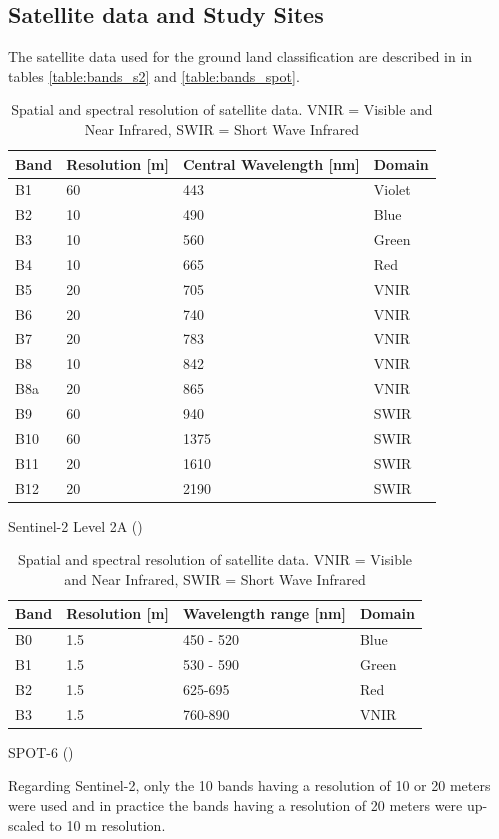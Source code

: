 \documentclass[10pt]{article}
\begin{document}
\subsection{Satellite data and Study Sites}
The satellite data used for the ground land classification are described in in tables \ref{table:bands_s2} and \ref{table:bands_spot}.
\begin{table}[H]
    \centering
    \begin{subtable}{.52\textwidth}
        \centering
        \begin{tabular}{@{}lp{2cm}p{2.2cm}l@{}}\toprule
            Band & Resolution [m] & Central Wavelength [nm] & Domain \\\hline
            B1 & 60 & 443 & Violet \\
            B2 & 10 & 490 & Blue \\
            B3 & 10 & 560 & Green \\
            B4 & 10 & 665 & Red \\
            B5 & 20 & 705 & VNIR \\
            B6 & 20 & 740 & VNIR \\
            B7 & 20 & 783 & VNIR \\
            B8 & 10 & 842 & VNIR \\
            B8a & 20 & 865 & VNIR \\
            B9 & 60 & 940 & SWIR \\
            B10 & 60 & 1375 & SWIR \\
            B11 & 20 & 1610 & SWIR \\
            B12 & 20 & 2190 & SWIR\\\bottomrule
        \end{tabular}
        \caption{Sentinel-2 Level 2A (\cite{esa-s2res,theia})}
        \label{table:bands_s2}
    \end{subtable}
    \begin{subtable}{.45\textwidth}
        \centering
        \begin{tabular}{@{}lp{1.8cm}p{2cm}l@{}}\toprule
            Band & Resolution [m] & Wavelength range [nm] & Domain \\\hline
            B0 & 1.5 & 450 - 520 & Blue \\
            B1 & 1.5 & 530 - 590 & Green \\
            B2 & 1.5 & 625-695 & Red \\
            B3 & 1.5 & 760-890 & VNIR \\\bottomrule
        \end{tabular}
        \caption{SPOT-6 (\cite{SPOT6_technical-sheet})}
        \label{table:bands_spot}
    \end{subtable}
    \caption{Spatial and spectral resolution of satellite data. VNIR = Visible and Near Infrared, SWIR = Short Wave Infrared}
    \label{table:bands}
\end{table}
Regarding Sentinel-2, only the 10 bands having a resolution of 10 or 20 meters were used and in practice the bands having a resolution of 20 meters were up-scaled to 10 m resolution.\\
\end{document}
